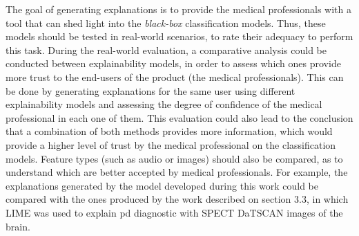 The goal of generating explanations is to provide the medical professionals with a tool that can shed light into the \textit{black-box} classification models. Thus, these models should be tested in real-world scenarios, to rate their adequacy to perform this task. During the real-world evaluation, a comparative analysis could be conducted between explainability models, in order to assess which ones provide more trust to the end-users of the product (the medical professionals). This can be done by generating explanations for the same user using different explainability models and assessing the degree of confidence of the medical professional in each one of them. This evaluation could also lead to the conclusion that a combination of both methods provides more information, which would provide a higher level of trust by the medical professional on the classification models. Feature types (such as audio or images) should also be compared, as to understand which are better accepted by medical professionals. For example, the explanations generated by the model developed during this work could be compared with the ones produced by the work described on section 3.3, in which LIME was used to explain \gls{pd} diagnostic with SPECT DaTSCAN images of the brain.

